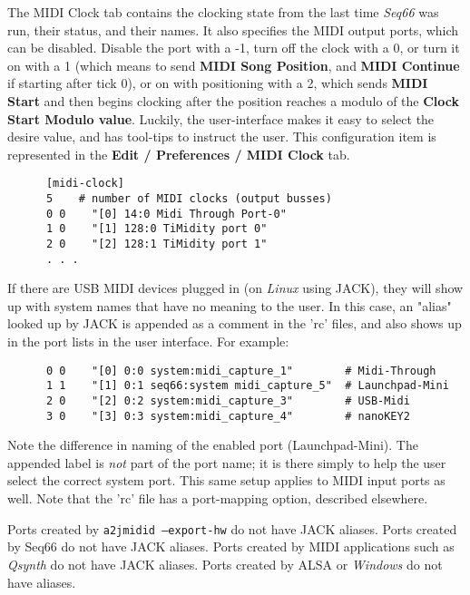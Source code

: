    The MIDI Clock tab contains the clocking state from the last 
   time \textsl{Seq66} was run, their status, and their names.
   It also specifies the MIDI output ports, which can be disabled.
   Disable the port with a -1, turn off the clock with a 0,
   or turn it on with a 1 (which means to send
   \textbf{MIDI Song Position}, and
   \textbf{MIDI Continue} if
   starting after tick 0), or on with positioning with a 2, which sends
   \textbf{MIDI Start}
   and then begins clocking after the position reaches a modulo of the
   \textbf{Clock Start Modulo value}.  Luckily, the user-interface makes it
   easy to select the desire value, and has tool-tips to instruct the user.
   This configuration item is represented in the
   \textbf{Edit / Preferences / MIDI Clock} tab.

   \begin{verbatim}
      [midi-clock]
      5    # number of MIDI clocks (output busses)
      0 0    "[0] 14:0 Midi Through Port-0"
      1 0    "[1] 128:0 TiMidity port 0"
      2 0    "[2] 128:1 TiMidity port 1"
      . . .
   \end{verbatim}

   If there are USB MIDI devices plugged in (on \textsl{Linux} using JACK),
   they will show up with system names that have no meaning to the user.
   In this case, an "alias" looked up by JACK is appended as a comment in the
   'rc' files, and also shows up in the port lists in the user interface.
   For example:

   \begin{verbatim}
      0 0    "[0] 0:0 system:midi_capture_1"        # Midi-Through
      1 1    "[1] 0:1 seq66:system midi_capture_5"  # Launchpad-Mini
      2 0    "[2] 0:2 system:midi_capture_3"        # USB-Midi
      3 0    "[3] 0:3 system:midi_capture_4"        # nanoKEY2
   \end{verbatim}

   Note the difference in naming of the enabled port (Launchpad-Mini).
   The appended label is \textsl{not} part of the port name;
   it is there simply to help the user select the correct system port.
   This same setup applies to MIDI input ports as well.
   Note that the 'rc' file has a port-mapping option, described elsewhere.

   Ports created by \texttt{a2jmidid --export-hw} do not have JACK aliases.
   Ports created by Seq66 do not have JACK aliases.  Ports created by MIDI
   applications such as \textsl{Qsynth} do not have JACK aliases. Ports
   created by ALSA or \textsl{Windows} do not have aliases.

